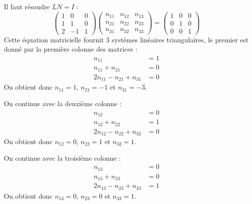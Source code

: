 \begin{enumerate}
{\begin{solution}
            Il faut résoudre $L N = I$ : 
            \[
                \begin{pmatrix}
                    1 & 0 & 0 \\
                    1 & 1 & 0 \\
                    2 & -1 & 1
                \end{pmatrix}
                \begin{pmatrix}
                    n_{11} & n_{12} & n_{13} \\
                    n_{21} & n_{22} & n_{23} \\
                    n_{31} & n_{32} & n_{33}
                \end{pmatrix}
                = \begin{pmatrix} 1 & 0 & 0 \\ 0 & 1 & 0 \\ 0 & 0 & 1 \end{pmatrix}
            \]
            Cette équation matricielle fournit 3 systèmes linéaires triangulaires, le premier est donné par la première colonne des matrices : 
            \begin{align*}
                n_{11} &= 1 \\
                n_{11} + n_{21} &= 0 \\
                2 n_{11} - n_{21} + n_{31} &= 0
            \end{align*}
            On obtient donc $n_{11} = 1$, $n_{21} = -1$ et $n_{31} = -3$.
            
            On continue avec la deuxième colonne :
            \begin{align*}
                n_{12} &= 0 \\
                n_{12} + n_{22} &= 1 \\
                2n_{12} - n_{22} + n_{32} &= 0
            \end{align*}
            On obtient donc $n_{12} = 0$, $n_{22} = 1$ et $n_{32} = 1$.
            
            On continue avec la troisième colonne :
            \begin{align*}
                n_{13} &= 0 \\
                n_{13} + n_{23} &= 0 \\
                2n_{13} - n_{23} + n_{33} &= 1
            \end{align*}
            On obtient donc $n_{13} = 0$, $n_{23} = 0$ et $n_{33} = 1$.


\end{solution}}
\end{enumerate}
